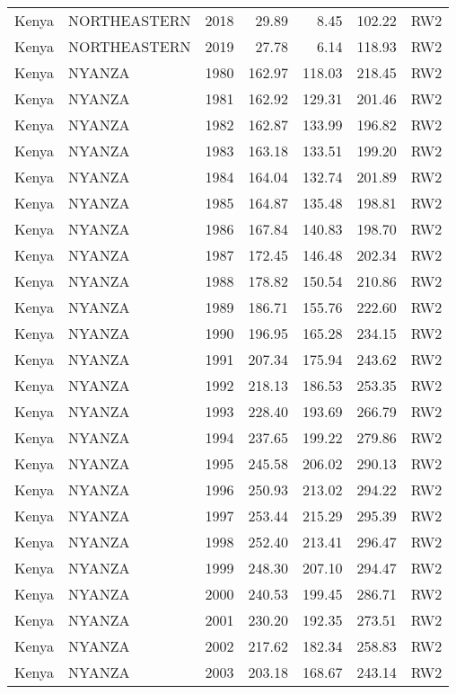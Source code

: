 \begin{longtable}{lllrrrl}
  Kenya & NORTHEASTERN & 2018 & 29.89 & 8.45 & 102.22 & RW2 \\ 
  Kenya & NORTHEASTERN & 2019 & 27.78 & 6.14 & 118.93 & RW2 \\ 
  Kenya & NYANZA & 1980 & 162.97 & 118.03 & 218.45 & RW2 \\ 
  Kenya & NYANZA & 1981 & 162.92 & 129.31 & 201.46 & RW2 \\ 
  Kenya & NYANZA & 1982 & 162.87 & 133.99 & 196.82 & RW2 \\ 
  Kenya & NYANZA & 1983 & 163.18 & 133.51 & 199.20 & RW2 \\ 
  Kenya & NYANZA & 1984 & 164.04 & 132.74 & 201.89 & RW2 \\ 
  Kenya & NYANZA & 1985 & 164.87 & 135.48 & 198.81 & RW2 \\ 
  Kenya & NYANZA & 1986 & 167.84 & 140.83 & 198.70 & RW2 \\ 
  Kenya & NYANZA & 1987 & 172.45 & 146.48 & 202.34 & RW2 \\ 
  Kenya & NYANZA & 1988 & 178.82 & 150.54 & 210.86 & RW2 \\ 
  Kenya & NYANZA & 1989 & 186.71 & 155.76 & 222.60 & RW2 \\ 
  Kenya & NYANZA & 1990 & 196.95 & 165.28 & 234.15 & RW2 \\ 
  Kenya & NYANZA & 1991 & 207.34 & 175.94 & 243.62 & RW2 \\ 
  Kenya & NYANZA & 1992 & 218.13 & 186.53 & 253.35 & RW2 \\ 
  Kenya & NYANZA & 1993 & 228.40 & 193.69 & 266.79 & RW2 \\ 
  Kenya & NYANZA & 1994 & 237.65 & 199.22 & 279.86 & RW2 \\ 
  Kenya & NYANZA & 1995 & 245.58 & 206.02 & 290.13 & RW2 \\ 
  Kenya & NYANZA & 1996 & 250.93 & 213.02 & 294.22 & RW2 \\ 
  Kenya & NYANZA & 1997 & 253.44 & 215.29 & 295.39 & RW2 \\ 
  Kenya & NYANZA & 1998 & 252.40 & 213.41 & 296.47 & RW2 \\ 
  Kenya & NYANZA & 1999 & 248.30 & 207.10 & 294.47 & RW2 \\ 
  Kenya & NYANZA & 2000 & 240.53 & 199.45 & 286.71 & RW2 \\ 
  Kenya & NYANZA & 2001 & 230.20 & 192.35 & 273.51 & RW2 \\ 
  Kenya & NYANZA & 2002 & 217.62 & 182.34 & 258.83 & RW2 \\ 
  Kenya & NYANZA & 2003 & 203.18 & 168.67 & 243.14 & RW2 \\ 

\end{longtable}
